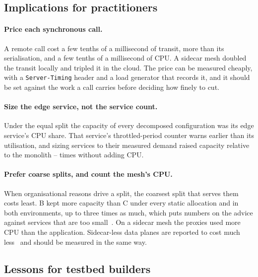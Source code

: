 \subsection{Implications for practitioners}

\paragraph{Price each synchronous call.} A remote call cost a few tenths of a millisecond of transit, more than its
serialisation, and a few tenths of a millisecond of CPU. A sidecar mesh doubled the transit locally and tripled it
in the cloud. The price can be measured cheaply, with a \texttt{Server-Timing} header and a load generator that
records it, and it should be set against the work a call carries before deciding how finely to cut.

\paragraph{Size the edge service, not the service count.} Under the equal split the capacity of every decomposed configuration was its edge service's CPU share. That service's throttled-period counter warns earlier than its utilisation, and sizing
services to their measured demand raised capacity relative to the monolith --
times without adding CPU.

\paragraph{Prefer coarse splits, and count the mesh's CPU.} When organisational reasons drive a split, the coarsest
split that serves them costs least. B kept more capacity than C under every static allocation and in both environments, up to three times as
much, which puts numbers on the advice against services that are too small~\cite{Taibi2018}. On a
sidecar mesh the proxies used more CPU than the application. Sidecar-less data planes are reported to cost much
less~\cite{BremlerBarr2025} and should be measured in the same way.

\subsection{Lessons for testbed builders}

